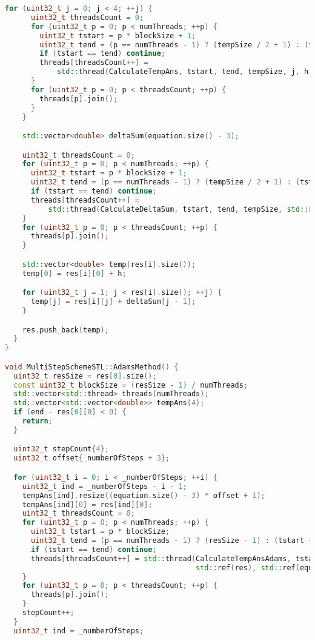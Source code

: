 \documentclass{report}
\begin{document}
\begin{lstlisting}[language=C++,caption=STL версия]
    for (uint32_t j = 0; j < 4; ++j) {
      uint32_t threadsCount = 0;
      for (uint32_t p = 0; p < numThreads; ++p) {
        uint32_t tstart = p * blockSize + 1;
        uint32_t tend = (p == numThreads - 1) ? (tempSize / 2 + 1) : (tstart + blockSize);
        if (tstart == tend) continue;
        threads[threadsCount++] =
            std::thread(CalculateTempAns, tstart, tend, tempSize, j, h, std::ref(equation), std::ref(tempAns));
      }
      for (uint32_t p = 0; p < threadsCount; ++p) {
        threads[p].join();
      }
    }

    std::vector<double> deltaSum(equation.size() - 3);

    uint32_t threadsCount = 0;
    for (uint32_t p = 0; p < numThreads; ++p) {
      uint32_t tstart = p * blockSize + 1;
      uint32_t tend = (p == numThreads - 1) ? (tempSize / 2 + 1) : (tstart + blockSize);
      if (tstart == tend) continue;
      threads[threadsCount++] =
          std::thread(CalculateDeltaSum, tstart, tend, tempSize, std::ref(tempAns), std::ref(deltaSum));
    }
    for (uint32_t p = 0; p < threadsCount; ++p) {
      threads[p].join();
    }

    std::vector<double> temp(res[i].size());
    temp[0] = res[i][0] + h;

    for (uint32_t j = 1; j < res[i].size(); ++j) {
      temp[j] = res[i][j] + deltaSum[j - 1];
    }

    res.push_back(temp);
  }
}

void MultiStepSchemeSTL::AdamsMethod() {
  uint32_t resSize = res[0].size();
  const uint32_t blockSize = (resSize - 1) / numThreads;
  std::vector<std::thread> threads(numThreads);
  std::vector<std::vector<double>> tempAns(4);
  if (end - res[0][0] < 0) {
    return;
  }

  uint32_t stepCount{4};
  uint32_t offset{_numberOfSteps + 3};

  for (uint32_t i = 0; i < _numberOfSteps; ++i) {
    uint32_t ind = _numberOfSteps - i - 1;
    tempAns[ind].resize((equation.size() - 3) * offset + 1);
    tempAns[ind][0] = res[ind][0];
    uint32_t threadsCount = 0;
    for (uint32_t p = 0; p < numThreads; ++p) {
      uint32_t tstart = p * blockSize;
      uint32_t tend = (p == numThreads - 1) ? (resSize - 1) : (tstart + blockSize);
      if (tstart == tend) continue;
      threads[threadsCount++] = std::thread(CalculateTempAnsAdams, tstart, tend, stepCount, ind, offset, h, i, resSize,
                                            std::ref(res), std::ref(equation), std::ref(tempAns));
    }
    for (uint32_t p = 0; p < threadsCount; ++p) {
      threads[p].join();
    }
    stepCount++;
  }
  uint32_t ind = _numberOfSteps;


\end{lstlisting}
\end{document}
